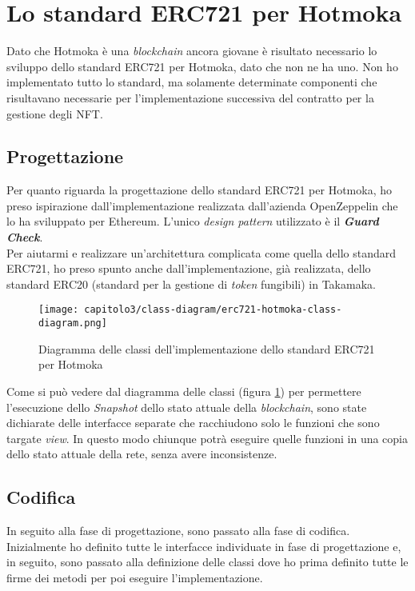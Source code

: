 
\section{Lo standard ERC721 per Hotmoka}
Dato che Hotmoka è una \textit{blockchain} ancora giovane è risultato necessario lo sviluppo dello standard ERC721 per Hotmoka, dato che non ne ha uno. Non ho implementato tutto lo standard, ma solamente determinate componenti che risultavano necessarie per l'implementazione successiva del contratto per la gestione degli NFT.

\subsection{Progettazione}
Per quanto riguarda la progettazione dello standard ERC721 per Hotmoka, ho preso ispirazione dall'implementazione realizzata dall'azienda OpenZeppelin che lo ha sviluppato per Ethereum. L'unico \textit{design pattern} utilizzato è il \textbf{\textit{Guard Check}}. \\

Per aiutarmi e realizzare un'architettura complicata come quella dello standard ERC721, ho preso spunto anche dall'implementazione, già realizzata, dello standard ERC20 (standard per la gestione di \textit{token} fungibili) in Takamaka.

\begin{figure}[h!]
  \centering
  \texttt{[image: capitolo3/class-diagram/erc721-hotmoka-class-diagram.png]}
  \caption{Diagramma delle classi dell'implementazione dello standard ERC721 per Hotmoka}
  \label{fig:erc721-hotmoka-class-diagram}
\end{figure}

Come si può vedere dal diagramma delle classi (figura \ref{fig:erc721-hotmoka-class-diagram}) per permettere l'esecuzione dello \textit{Snapshot} dello stato attuale della \textit{blockchain}, sono state dichiarate delle interfacce separate che racchiudono solo le funzioni che sono targate \textit{view}. In questo modo chiunque potrà eseguire quelle funzioni in una copia dello stato attuale della rete, senza avere inconsistenze.

\subsection{Codifica}
In seguito alla fase di progettazione, sono passato alla fase di codifica.
Inizialmente ho definito tutte le interfacce individuate in fase di progettazione e, in seguito, sono passato alla definizione delle classi dove ho prima definito tutte le firme dei metodi per poi eseguire l'implementazione. \\


